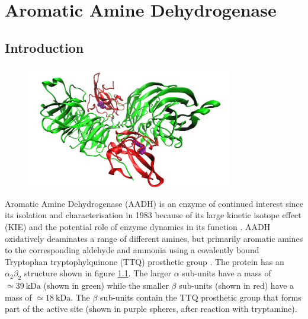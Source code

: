 %
%

\chapter{Aromatic Amine Dehydrogenase}
\label{chap:aadh}

\section{Introduction}
\begin{figure}
    \centering
    \includegraphics[width=0.8\textwidth]{chapters/aadh/figures/aadh_full_structure.png}
    \label{fig:aadh_full_structure}
\end{figure}

Aromatic Amine Dehydrogenase (AADH) is an enzyme of continued interest since its isolation and characterisation in 1983 \cite{iwakiCrystallizationPropertiesAromatic1983} because of its large kinetic isotope effect (KIE) \cite{hyunUnusuallyLargeIsotope1995a}\cite{basranImportanceBarrierShape2001a}  and the potential role of enzyme dynamics in its function \cite{mcgeaghProteinDynamicsEnzyme2011}\cite{glowackiProteinDynamicsEnzyme2012a}\cite{glowackiTakingOckhamRazor2012b}.  AADH oxidatively deaminates a range of different amines, but primarily aromatic amines \cite{hyunMechanisticStudiesAromatic1995a} to the corresponding aldehyde and ammonia using a covalently bound Tryptophan tryptophylquinone (TTQ) prosthetic group \cite{govindarajAromaticAmineDehydrogenase1994a}. The protein has an $\alpha_{2}\beta_{2}$ structure shown in figure \ref{fig:aadh_full_structure}. The larger $\alpha$ sub-units have a mass of $\simeq \SI{39}{\kilo\dalton}$ (shown in green) while the smaller $\beta$ sub-units (shown in red) have a mass of $\simeq \SI{18}{\kilo\dalton}$. The $\beta$ sub-units contain the TTQ prosthetic group that forms part of the active site (shown in purple spheres, after reaction with tryptamine). 



